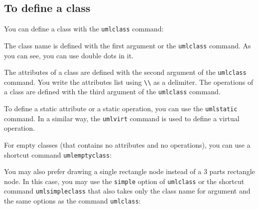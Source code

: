 \documentclass[a4paper,11pt]{report}
\begin{document}
\subsection{To define a class}\label{ss.class}

You can define a class with the {\tt umlclass} command:

\medskip

\begin{minipage}{0.5\textwidth}

\end{minipage}
\begin{minipage}{0.4\textwidth}
\begin{center}
\end{center}
\end{minipage}

\medskip

The class name is defined with the first argument or the {\tt umlclass} command. As you can see, you can use double dots in it.

The attributes of a class are defined with the second argument of the {\tt umlclass} command. You write the attributes list using \lstinline{\\} as a delimiter. The operations of a class are defined with the third argument of the {\tt umlclass} command. 

To define a static attribute or a static operation, you can use the {\tt umlstatic} command. In a similar way, the {\tt umlvirt} command is used to define a virtual operation.

\medskip

For empty classes (that contains no attributes and no operations), you can use a shortcut command {\tt umlemptyclass}:

\begin{minipage}{0.5\textwidth}

\end{minipage}
\begin{minipage}{0.4\textwidth}
\begin{center}
\end{center}
\end{minipage}

\medskip

You may also prefer drawing a single rectangle node instead of a 3 parts rectangle node. In this case, you may use the {\tt simple} option of {\tt umlclass} or the shortcut command {\tt umlsimpleclass} that also takes only the class name for argument and the same options as the command {\tt umlclass}:
\end{document}
